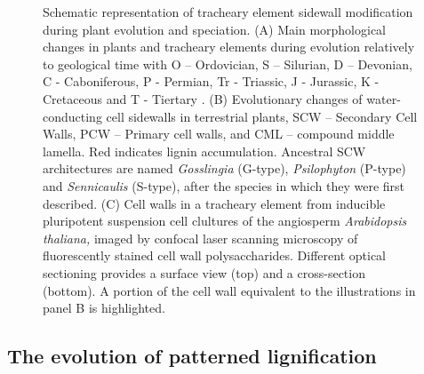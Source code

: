 \documentclass[journal=,manuscript=]{achemso}
\begin{document}
\begin{figure}


\caption{\label{fig-evolution}Schematic representation of tracheary
element sidewall modification during plant evolution and speciation. (A)
Main morphological changes in plants and tracheary elements during
evolution relatively to geological time with O -- Ordovician, S --
Silurian, D -- Devonian, C - Caboniferous, P - Permian, Tr - Triassic, J
- Jurassic, K - Cretaceous and T - Tiertary . (B) Evolutionary changes
of water-conducting cell sidewalls in terrestrial plants, SCW --
Secondary Cell Walls, PCW -- Primary cell walls, and CML -- compound
middle lamella. Red indicates lignin accumulation. Ancestral SCW
architectures are named \emph{Gosslingia} (G-type), \emph{Psilophyton}
(P-type) and \emph{Sennicaulis} (S-type), after the species in which
they were first described.\citep{Edwards2003} (C) Cell walls in a
tracheary element from inducible pluripotent suspension cell clultures
of the angiosperm \emph{Arabidopsis thaliana,} imaged by confocal laser
scanning microscopy of fluorescently stained cell wall polysaccharides.
Different optical sectioning provides a surface view (top) and a
cross-section (bottom). A portion of the cell wall equivalent to the
illustrations in panel B is highlighted.}

\end{figure}%

\subsection{The evolution of patterned
lignification}\label{the-evolution-of-patterned-lignification}
\end{document}
